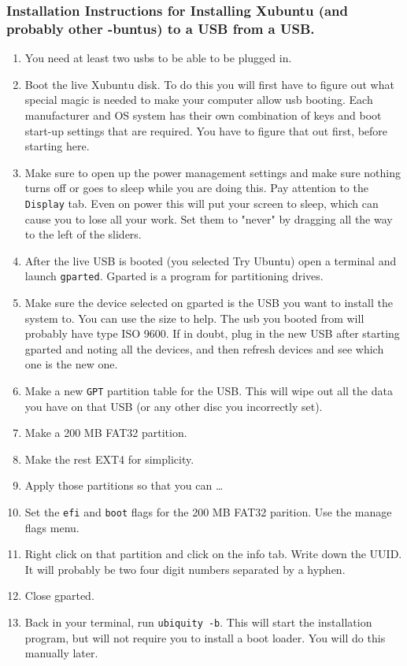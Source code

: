 \documentclass{article}
\begin{document}
\subsubsection{Installation Instructions for Installing Xubuntu (and probably other -buntus) to a USB from a USB.}
\label{sec:org1aa4178}
\begin{enumerate}
\item You need at least two usbs to be able to be plugged in.
\item Boot the live Xubuntu disk. To do this you will first have to figure out what special magic is needed to make your computer allow usb booting. Each manufacturer and OS system has their own combination of keys and boot start-up settings that are required. You have to figure that out first, before starting here.
\item Make sure to open up the power management settings and make sure nothing turns off or goes to sleep while you are doing this. Pay attention to the \texttt{Display} tab. Even on power this will put your screen to sleep, which can cause you to lose all your work. Set them to "never" by dragging all the way to the left of the sliders.
\item After the live USB is booted (you selected Try Ubuntu) open a terminal and launch \texttt{gparted}. Gparted is a program for partitioning drives.
\item Make sure the device selected on gparted is the USB you want to install the system to. You can use the size to help. The usb you  booted from will probably have type ISO 9600. If in doubt, plug in the new USB after starting gparted and noting all the devices, and then refresh devices and see which one is the new one.
\item Make a new \texttt{GPT} partition table for the USB. This will wipe out all the data you have on that USB (or any other disc you incorrectly set).
\item Make a 200 MB FAT32 partition.
\item Make the rest EXT4 for simplicity.
\item Apply those partitions so that you can \ldots{}
\item Set the \texttt{efi} and \texttt{boot} flags for the 200 MB FAT32 parition. Use the manage flags menu.
\item Right click on that partition and click on the info tab. Write down the UUID. It will probably be two four digit numbers separated by a hyphen.
\item Close gparted.
\item Back in your terminal, run \texttt{ubiquity -b}. This will start the installation program, but will not require you to install a boot loader. You will do this manually later.

\end{enumerate}
\end{document}
